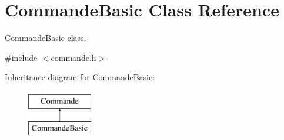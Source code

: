 \hypertarget{class_commande_basic}{\section{Commande\-Basic Class Reference}
\label{class_commande_basic}
}


\hyperlink{class_commande_basic}{Commande\-Basic} class.  




{\ttfamily \#include $<$commande.\-h$>$}

Inheritance diagram for Commande\-Basic\-:\begin{figure}[H]
\begin{center}
\leavevmode
\includegraphics[height=2.000000cm]{class_commande_basic}
\end{center}
\end{figure}
